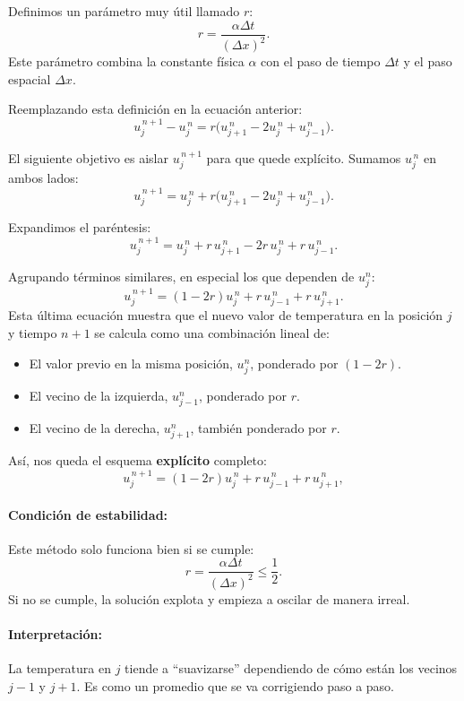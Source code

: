 \documentclass[12pt,a4paper]{article}
\begin{document}
Definimos un parámetro muy útil llamado $r$:
\[
r = \frac{\alpha \Delta t}{(\Delta x)^2}.
\]
Este parámetro combina la constante física \(\alpha\) con el paso de tiempo \(\Delta t\) y el paso espacial \(\Delta x\). 

Reemplazando esta definición en la ecuación anterior:
\[
u_j^{\,n+1}-u_j^{\,n} = r\big(u_{j+1}^{\,n}-2u_j^{\,n}+u_{j-1}^{\,n}\big).
\]

El siguiente objetivo es aislar \(u_j^{\,n+1}\) para que quede explícito. Sumamos \(u_j^{\,n}\) en ambos lados:
\[
u_j^{\,n+1} = u_j^{\,n} + r\big(u_{j+1}^{\,n}-2u_j^{\,n}+u_{j-1}^{\,n}\big).
\]

Expandimos el paréntesis:
\[
u_j^{\,n+1} = u_j^{\,n} + r\,u_{j+1}^{\,n} - 2r\,u_j^{\,n} + r\,u_{j-1}^{\,n}.
\]

Agrupando términos similares, en especial los que dependen de \(u_j^n\):
\[
u_j^{\,n+1} = (1 - 2r)u_j^{\,n} + r\,u_{j-1}^{\,n} + r\,u_{j+1}^{\,n}.
\]
\newline
Esta última ecuación muestra que el nuevo valor de temperatura en la posición \(j\) y tiempo \(n+1\) se calcula como una combinación lineal de:
\begin{itemize}
    \item El valor previo en la misma posición, \(u_j^n\), ponderado por \((1-2r)\).
    \item El vecino de la izquierda, \(u_{j-1}^n\), ponderado por \(r\).
    \item El vecino de la derecha, \(u_{j+1}^n\), también ponderado por \(r\).
\end{itemize}


Así, nos queda el esquema \textbf{explícito} completo:
\[
\boxed{u_j^{\,n+1} = (1 - 2r)u_j^{\,n} + r\,u_{j-1}^{\,n} + r\,u_{j+1}^{\,n}},
\]


\paragraph{Condición de estabilidad:}  
Este método solo funciona bien si se cumple:
\[
r = \frac{\alpha \Delta t}{(\Delta x)^2} \leq \frac{1}{2}.
\]
Si no se cumple, la solución explota y empieza a oscilar de manera irreal.

\paragraph{Interpretación:}  
La temperatura en $j$ tiende a ``suavizarse'' dependiendo de cómo están los vecinos $j-1$ y $j+1$. Es como un promedio que se va corrigiendo paso a paso.
\end{document}
